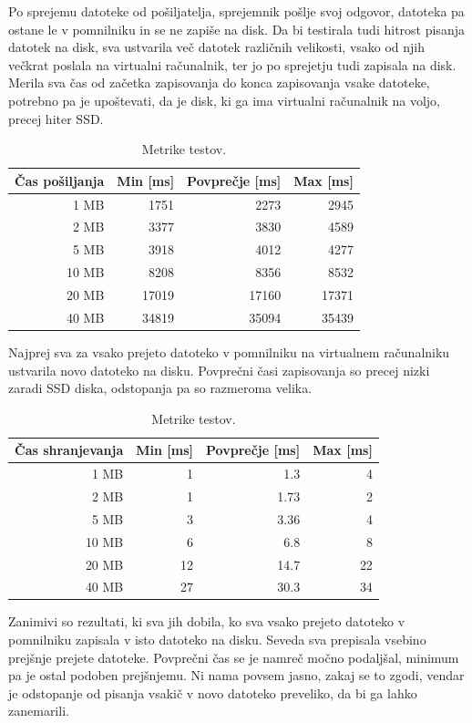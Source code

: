 Po sprejemu datoteke od pošiljatelja, sprejemnik pošlje svoj odgovor, datoteka pa ostane le v pomnilniku in se ne zapiše na disk. Da bi testirala tudi hitrost pisanja datotek na disk, sva ustvarila več datotek različnih velikosti, vsako od njih večkrat poslala na virtualni računalnik, ter jo po sprejetju tudi zapisala na disk. Merila sva čas od začetka zapisovanja do konca zapisovanja vsake datoteke, potrebno pa je upoštevati, da je disk, ki ga ima virtualni računalnik na voljo, precej hiter SSD.

\begin{table}[H]
	\centering
	\begin{tabular}{ | r | r | r | r | }
		\hline
		Čas pošiljanja & Min [ms] & Povprečje [ms] & Max [ms]  \\
		\hline
		1 MB & 1751 & 2273 & 2945 \\
		2 MB & 3377 & 3830 & 4589 \\
		5 MB & 3918 & 4012 & 4277 \\
		10 MB & 8208 & 8356 & 8532 \\
		20 MB & 17019 & 17160 & 17371 \\
		40 MB & 34819 & 35094 & 35439 \\
		\hline
	\end{tabular}
	\caption{Metrike  testov.}
	\label{table:1_chunks}
\end{table}

Najprej sva za vsako prejeto datoteko v pomnilniku na virtualnem računalniku ustvarila novo datoteko na disku. Povprečni časi zapisovanja so precej nizki zaradi SSD diska, odstopanja pa so razmeroma velika.

\begin{table}[H]
	\centering
	\begin{tabular}{ | r | r | r | r | }
		\hline
		Čas shranjevanja & Min [ms] & Povprečje [ms] & Max [ms]  \\
		\hline
		1 MB & 1 & 1.3 & 4 \\
		2 MB & 1 & 1.73 & 2 \\
		5 MB & 3 & 3.36 & 4 \\
		10 MB & 6 & 6.8 & 8 \\
		20 MB & 12 & 14.7 & 22 \\
		40 MB & 27 & 30.3 & 34 \\
		\hline
	\end{tabular}
	\caption{Metrike  testov.}
	\label{table:1_chunks}
\end{table}

Zanimivi so rezultati, ki sva jih dobila, ko sva vsako prejeto datoteko v pomnilniku zapisala v isto datoteko na disku. Seveda sva prepisala vsebino prejšnje prejete datoteke. Povprečni čas se je namreč močno podaljšal, minimum pa je ostal podoben prejšnjemu. Ni nama povsem jasno, zakaj se to zgodi, vendar je odstopanje od pisanja vsakič v novo datoteko preveliko, da bi ga lahko zanemarili.

